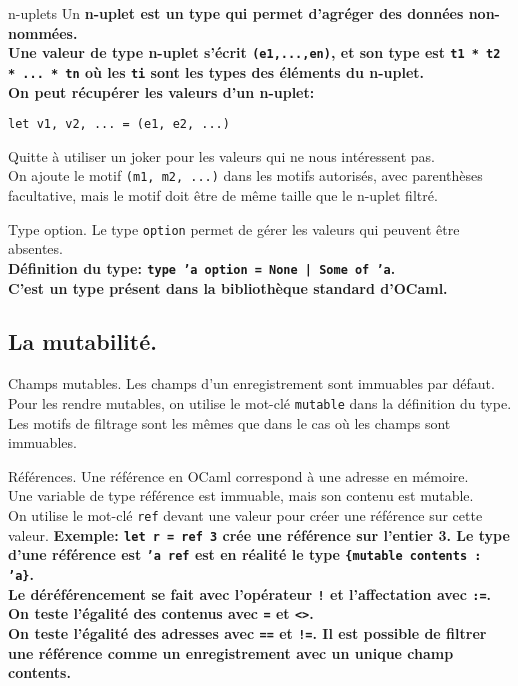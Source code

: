 \documentclass[french, 11pt]{article}
\begin{document}
\begin{defi}{n-uplets}{}
    Un \bf{n-uplet} est un type qui permet d'agréger des données non-nommées.\\
    Une valeur de type n-uplet s'écrit \texttt{(e1,...,en)}, et son type est \texttt{t1 * t2 * ... * tn} où les \texttt{ti} sont les types des éléments du n-uplet.\\
    On peut récupérer les valeurs d'un n-uplet:
    \begin{center}
        \texttt{let v1, v2, ... = (e1, e2, ...)}
    \end{center}
    Quitte à utiliser un joker pour les valeurs qui ne nous intéressent pas.\\
    On ajoute le motif \texttt{(m1, m2, ...)} dans les motifs autorisés, avec parenthèses facultative, mais le motif doit être de même taille que le n-uplet filtré.
\end{defi}

\begin{defi}{Type option.}{}
    Le type \texttt{option} permet de gérer les valeurs qui peuvent être absentes.\\
    \bf{Définition du type:} \texttt{type 'a option = None | Some of 'a}.\\
    C'est un type présent dans la bibliothèque standard d'OCaml.
\end{defi}

\subsection{La mutabilité.}

\begin{defi}{Champs mutables.}{}
    Les champs d'un enregistrement sont immuables par défaut.\\
    Pour les rendre mutables, on utilise le mot-clé \texttt{mutable} dans la définition du type.\\
    Les motifs de filtrage sont les mêmes que dans le cas où les champs sont immuables.
\end{defi}

\begin{defi}{Références.}{}
    Une référence en OCaml correspond à une adresse en mémoire.\\
    Une variable de type référence est immuable, mais son contenu est mutable.\\
    On utilise le mot-clé \texttt{ref} devant une valeur pour créer une référence sur cette valeur.\n
    \bf{Exemple:} \texttt{let r = ref 3} crée une référence sur l'entier 3.\n
    Le type d'une référence est \texttt{'a ref} est en réalité le type \texttt{\{mutable contents : 'a\}}.\\
    Le déréférencement se fait avec l'opérateur \texttt{!} et l'affectation avec \texttt{:=}.\n
    On teste l'égalité des contenus avec \texttt{=} et \texttt{<>}.\\
    On teste l'égalité des adresses avec \texttt{==} et \texttt{!=}.\n
    Il est possible de filtrer une référence comme un enregistrement avec un unique champ contents.
\end{defi}
\end{document}
